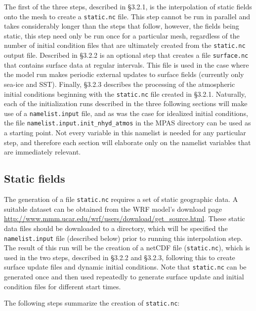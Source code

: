 \documentclass[11pt]{report}
\begin{document}
The first of the three steps, described in \S 3.2.1, is the interpolation of static fields onto the mesh to create a {\tt static.nc} file.  This step cannot be run in parallel and takes considerably longer than the steps that follow, however, the fields being static, this step need only be run once for a particular mesh, regardless of the number of initial condition files that are ultimately created from the {\tt static.nc} output file.  Described in \S 3.2.2 is an optional step that creates a file {\tt surface.nc} that contains surface data at regular intervals. This file is used in the case where the model run makes periodic external updates to surface fields (currently only sea-ice and SST).  Finally, \S 3.2.3 describes the processing of the atmospheric initial conditions beginning with the {\tt static.nc} file created in \S 3.2.1.  Naturally, each of the initialization runs described in the three following sections will make use of a {\tt namelist.input} file, and as was the case for idealized initial conditions, the file {\tt namelist.input.init\_nhyd\_atmos} in the MPAS directory can be used as a starting point.  Not every variable in this namelist is needed for any particular step, and therefore each section will elaborate only on the namelist variables that are immediately relevant.

\subsection{Static fields}

The generation of a file {\tt static.nc} requires a set of static geographic data.  A suitable dataset can be obtained from the WRF model's download page \\
 \url{http://www.mmm.ucar.edu/wrf/users/download/get\_source.html}.  These static data files should be downloaded to a directory, which will be specified the {\tt namelist.input} file (described below) prior to running this interpolation step.  The result of this run will be the creation of a netCDF file ({\tt static.nc}), which is used in the two steps, described in \S 3.2.2 and \S 3.2.3, following this to create surface update files and dynamic initial conditions.  Note that {\tt static.nc} can be generated once and then used repeatedly to generate surface update and initial condition files for different start times.

The following steps summarize the creation of {\tt static.nc}:
\end{document}
